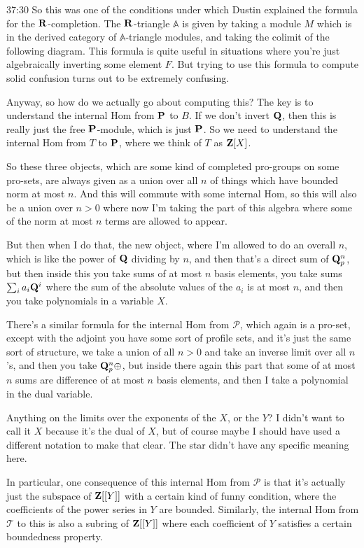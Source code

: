 \begin{unfinished}{37:30}
So this was one of the conditions under which Dustin explained the formula for the $\R$-completion. The $\R$-triangle $\mathbb{A}$ is given by taking a module $M$ which is in the derived category of $\mathbb{A}$-triangle modules, and taking the colimit of the following diagram. This formula is quite useful in situations where you're just algebraically inverting some element $F$. But trying to use this formula to compute solid confusion turns out to be extremely confusing.

Anyway, so how do we actually go about computing this? The key is to understand the internal Hom from $\P$ to $B$. If we don't invert $\Q$, then this is really just the free $\P$-module, which is just $\P$. So we need to understand the internal Hom from $T$ to $\P$, where we think of $T$ as $\Z[X]$.

So these three objects, which are some kind of completed pro-groups on some pro-sets, are always given as a union over all $n$ of things which have bounded norm at most $n$. And this will commute with some internal Hom, so this will also be a union over $n > 0$ where now I'm taking the part of this algebra where some of the norm at most $n$ terms are allowed to appear. 

But then when I do that, the new object, where I'm allowed to do an overall $n$, which is like the power of $\Q$ dividing by $n$, and then that's a direct sum of $\Q_p^n$, but then inside this you take sums of at most $n$ basis elements, you take sums $\sum_{i} a_i \Q^i$ where the sum of the absolute values of the $a_i$ is at most $n$, and then you take polynomials in a variable $X$.

There's a similar formula for the internal Hom from $\mathcal{P}$, which again is a pro-set, except with the adjoint you have some sort of profile sets, and it's just the same sort of structure, we take a union of all $n > 0$ and take an inverse limit over all $n$'s, and then you take $\Q_p^n \oplus$, but inside there again this part that some of at most $n$ sums are difference of at most $n$ basis elements, and then I take a polynomial in the dual variable.

Anything on the limits over the exponents of the $X$, or the $Y$? I didn't want to call it $X$ because it's the dual of $X$, but of course maybe I should have used a different notation to make that clear. The star didn't have any specific meaning here.

In particular, one consequence of this internal Hom from $\mathcal{P}$ is that it's actually just the subspace of $\Z[[Y]]$ with a certain kind of funny condition, where the coefficients of the power series in $Y$ are bounded. Similarly, the internal Hom from $\mathcal{T}$ to this is also a subring of $\Z[[Y]]$ where each coefficient of $Y$ satisfies a certain boundedness property.


\end{unfinished}

